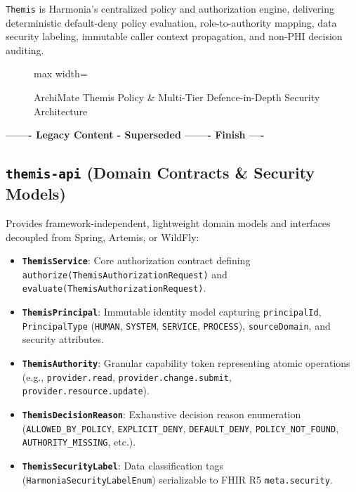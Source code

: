 \texttt{Themis} is Harmonia's centralized policy and authorization engine, delivering deterministic default-deny policy evaluation, role-to-authority mapping, data security labeling, immutable caller context propagation, and non-PHI decision auditing.

\begin{figure}[htbp]
    \centering
    \begin{adjustbox}{max width=\textwidth}
        
    \end{adjustbox}
    \caption{ArchiMate Themis Policy \& Multi-Tier Defence-in-Depth Security Architecture}
    \label{fig:themis_security}
\end{figure}


\par\noindent\textbf{------- Legacy Content - Superseded ------- Finish ----}

\subsection{\texttt{themis-api} (Domain Contracts \& Security Models)}
Provides framework-independent, lightweight domain models and interfaces decoupled from Spring, Artemis, or WildFly:
\begin{itemize}
    \item \textbf{\texttt{ThemisService}}: Core authorization contract defining \texttt{authorize(ThemisAuthorizationRequest)} and \texttt{evaluate(ThemisAuthorizationRequest)}.
    \item \textbf{\texttt{ThemisPrincipal}}: Immutable identity model capturing \texttt{principalId}, \texttt{PrincipalType} (\texttt{HUMAN}, \texttt{SYSTEM}, \texttt{SERVICE}, \texttt{PROCESS}), \texttt{sourceDomain}, and security attributes.
    \item \textbf{\texttt{ThemisAuthority}}: Granular capability token representing atomic operations (e.g., \texttt{provider.read}, \texttt{provider.change.submit}, \texttt{provider.resource.update}).
    \item \textbf{\texttt{ThemisDecisionReason}}: Exhaustive decision reason enumeration (\texttt{ALLOWED\_BY\_POLICY}, \texttt{EXPLICIT\_DENY}, \texttt{DEFAULT\_DENY}, \texttt{POLICY\_NOT\_FOUND}, \texttt{AUTHORITY\_MISSING}, etc.).
    \item \textbf{\texttt{ThemisSecurityLabel}}: Data classification tags (\texttt{HarmoniaSecurityLabelEnum}) serializable to FHIR R5 \texttt{meta.security}.
\end{itemize}

